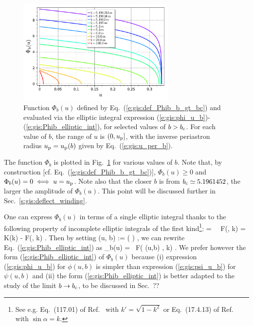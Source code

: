 \begin{figure}
\centerline{\includegraphics[width=0.7\textwidth]{gis_Phib_b_gt_bc.pdf}}
\caption[]{\label{f:gis:Phib_b_gt_bc} \footnotesize
Function $\Phi_b(u)$ defined by Eq.~(\ref{e:gis:def_Phib_b_gt_bc}) and
evaluated via the elliptic integral expression (\ref{e:gis:phi_u_b})-(\ref{e:gis:Phib_elliptic_int}),
for selected values of $b > b_{\rm c}$. For each value of $b$, the range of
$u$ is $(0, u_{\rm p}]$, with the inverse periastron radius $u_{\rm p} = u_{\rm p}(b)$
given by Eq.~(\ref{e:gis:u_per_b}).}
\end{figure}

The function $\Phi_b$ is plotted in Fig.~\ref{f:gis:Phib_b_gt_bc} for
various values of $b$. Note that, by construction [cf. Eq.~(\ref{e:gis:def_Phib_b_gt_bc})],
$\Phi_b(u) \geq 0$ and $\Phi_b(u) = 0 \iff u = u_{\rm p}$. Note also that the closer
$b$ is from $b_{\rm c} \simeq 5.1961452$, the larger the amplitude of $\Phi_b(u)$. This
point will be discussed further in Sec.~\ref{s:gis:deflect_winding}.

\begin{remark}
One can express $\Phi_b(u)$ in terms of a single elliptic integral
thanks to the following property of incomplete elliptic
integrals of the first kind\footnote{See e.g. Eq.~(117.01) of
Ref.~\cite{ByrdF71} with $k' = \sqrt{1-k^2}$
or Eq.~(17.4.13) of Ref.~\cite{AbramS72} with $\sin\alpha = k$.}:
\be \label{e:gis:add_elliptic_int}
   \tan\psi \tan\phi = \ \Longrightarrow \
   F(\psi, k) = K(k) - F(\phi, k) .
\ee
Then by setting
\be \label{e:gis:psi_u_b}
  \psi(u, b) := \arcsin\left(  \right) ,
\ee
we can rewrite Eq.~(\ref{e:gis:Phib_elliptic_int}) as
\be \label{e:gis:Phib_elliptic_int_psi}
     \Phi_b(u) = 
    \, F\left( \psi(u,b) ,\; k\right)  .
\ee
We prefer however the form (\ref{e:gis:Phib_elliptic_int}) of $\Phi_b(u)$
because (i) expression (\ref{e:gis:phi_u_b}) for $\phi(u, b)$ is simpler than
expression (\ref{e:gis:psi_u_b}) for $\psi(u, b)$ and (ii) the form (\ref{e:gis:Phib_elliptic_int}) is better adapted to the study of the limit
$b\to b_{\rm c}$, to be discussed in Sec.~??
\end{remark}

